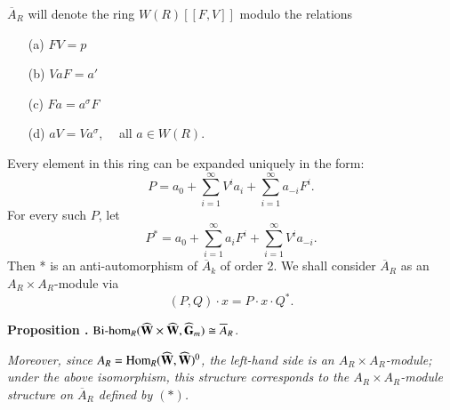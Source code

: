 \begin{defi*}
$\overline{A}_{R}$ will denote the ring $W(R)[[F,V]]$ modulo the relations
\begin{itemize}
\item[\rm(a)] $FV=p$

\item[\rm(b)] $VaF=a'$

\item[\rm(c)] $Fa=a^{\sigma}F$

\item[\rm(d)] $aV=Va^{\sigma}$, \ \ all $a\in W(R)$.
\end{itemize}
\end{defi*}
Every element in this ring can be expanded uniquely in the form:
$$
P=a_{0}+\sum\limits^{\infty}_{i=1}V^{i}a_{i}+\sum\limits^{\infty}_{i=1}a_{-i}F^{i}.
$$
For every such $P$, let
$$
P^{*}=a_{0}+\sum\limits^{\infty}_{i=1}a_{i}F^{i}+\sum\limits^{\infty}_{i=1}V^{i}a_{-i}.
$$\pageoriginale
Then * is an anti-automorphism of $\overline{A}_{k}$ of order 2. We shall consider $\overline{A}_{R}$ as an $A_{R}\times A_{R}$-module via
\begin{equation*}
(P,Q)\cdot x=P\cdot x\cdot Q^{*}.\tag{*}
\end{equation*}

\smallskip
\noindent
{\bf Proposition .\label{art15-prop3}}
$\text{\rm Bi-hom}_{R} (\widehat{\mathbf{W}}\times \widehat{\mathbf{W}},\widehat{\mathbf{G}}_{m})\cong \overline{A}_{R}$.

\smallskip
\noindent
{\em Moreover, since $A_{R}=\operatorname{\mathrm{Hom}}_{R}(\widehat{\mathbf{W}},\widehat{\mathbf{W}})^{0}$, the left-hand side is an $A_{R}\times A_{R}$-module; under the above isomorphism, this structure corresponds to the $A_{R}\times A_{R}$-module structure on $\overline{A}_{R}$ defined by $(*)$.}

